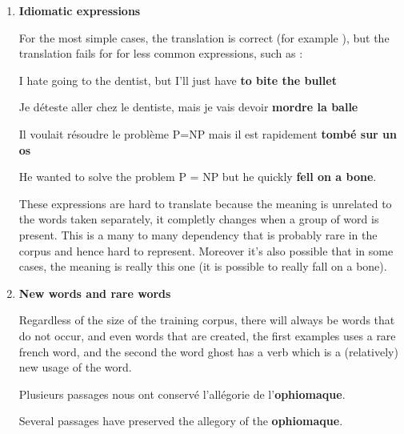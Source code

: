 \documentclass[a4paper, 11pt]{article}
\newcommand{\itemi}[1]{\item{\textbf{#1}}}
\begin{document}
\begin{enumerate}

  \itemi{Idiomatic expressions}

  For the most simple cases, the translation is correct (for example
  ), but the translation fails for for less
  common expressions, such as :

  \begin{inputcbox}
    I hate going to the dentist, but I'll just have \textbf{to bite the bullet}
  \end{inputcbox}
  \begin{outputcbox}
    Je déteste aller chez le dentiste, mais je vais devoir \textbf{mordre la balle}
  \end{outputcbox}
  \begin{inputcbox}
    Il voulait résoudre le problème P=NP mais il est rapidement \textbf{tombé sur un os}
  \end{inputcbox}
  \begin{outputcbox}
    He wanted to solve the problem P = NP but he quickly \textbf{fell on a bone}.
  \end{outputcbox}

  These expressions are hard to translate because the meaning is
  unrelated to the words taken separately, it completly changes when a
  group of word is present. This is a many to many dependency that is
  probably rare in the corpus and hence hard to represent. Moreover
  it's also possible that in some cases, the meaning is really this
  one (it is possible to really fall on a bone).

  \itemi{New words and rare words}

  Regardless of the size of the training corpus, there will always be
  words that do not occur, and even words that are created, the first
  examples uses a rare french word, and the second the word ghost has
  a verb which is a (relatively) new usage of the word.

  \begin{inputcbox}
    Plusieurs passages nous ont conservé l'allégorie de l'\textbf{ophiomaque}.
  \end{inputcbox}
  \begin{outputcbox}
    Several passages have preserved the allegory of the \textbf{ophiomaque}.
  \end{outputcbox}



\end{enumerate}
\end{document}
